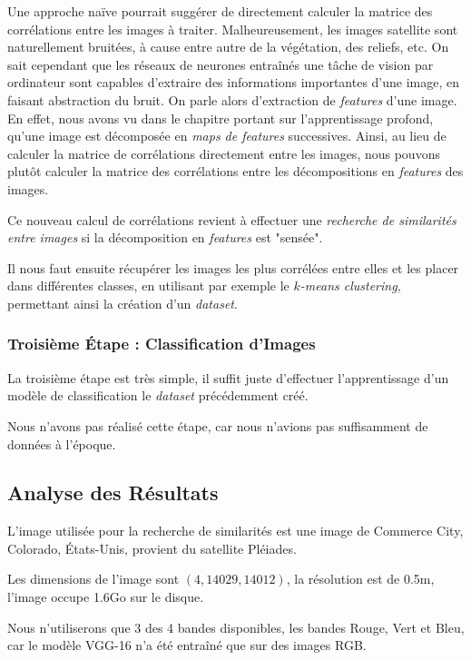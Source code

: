 \documentclass[a4paper, 11pt]{report}
\begin{document}
Une approche naïve pourrait suggérer de directement calculer la matrice des corrélations entre les images à traiter. Malheureusement, les images satellite sont naturellement bruitées, à cause entre autre de la végétation, des reliefs, etc.
On sait cependant que les réseaux de neurones entraînés une tâche de vision par ordinateur sont capables d'extraire des informations importantes d'une image, en faisant abstraction du bruit.
On parle alors d'extraction de \emph{features} d'une image.
En effet, nous avons vu dans le chapitre portant sur l'apprentissage profond, qu'une image est décomposée en \emph{maps de features} successives.
Ainsi, au lieu de calculer la matrice de corrélations directement entre les images, nous pouvons plutôt calculer la matrice des corrélations entre les décompositions en \emph{features} des images.

Ce nouveau calcul de corrélations revient à effectuer une \emph{recherche de similarités entre images} si la décomposition en \emph{features} est "sensée".


Il nous faut ensuite récupérer les images les plus corrélées entre elles et les placer dans différentes classes, en utilisant par exemple le $k$\emph{-means clustering}, permettant ainsi la création d'un \emph{dataset}.

\subsubsection{Troisième Étape : Classification d'Images}

La troisième étape est très simple, il suffit juste d'effectuer l'apprentissage d'un modèle de classification le \emph{dataset} précédemment créé.

Nous n'avons pas réalisé cette étape, car nous n'avions pas suffisamment de données à l'époque.

\subsection{Analyse des Résultats}
L'image utilisée pour la recherche de similarités est une image de Commerce City, Colorado, États-Unis, provient du satellite Pléiades.

Les dimensions de l'image sont $(4, 14029, 14012)$, la résolution est de 0.5m, l'image occupe 1.6Go sur le disque.

Nous n’utiliserons que 3 des 4 bandes disponibles, les bandes Rouge, Vert et Bleu, car le modèle VGG-16 n'a été entraîné que sur des images RGB.
\end{document}
